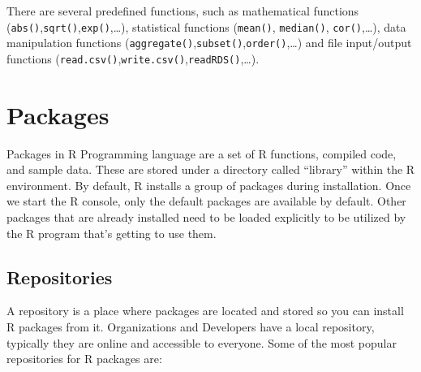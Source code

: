 \documentclass[
]{book}
\begin{document}
There are several predefined functions, such as mathematical functions (\texttt{abs()},\texttt{sqrt()},\texttt{exp()},\ldots), statistical functions (\texttt{mean()}, \texttt{median()}, \texttt{cor()},\ldots), data manipulation functions (\texttt{aggregate()},\texttt{subset()},\texttt{order()},\ldots) and file input/output functions (\texttt{read.csv()},\texttt{write.csv()},\texttt{readRDS()},\ldots).

\hypertarget{packages}{%
\section{Packages}\label{packages}}

Packages in R Programming language are a set of R functions, compiled code, and sample data. These are stored under a directory called ``library'' within the R environment. By default, R installs a group of packages during installation. Once we start the R console, only the default packages are available by default. Other packages that are already installed need to be loaded explicitly to be utilized by the R program that's getting to use them.

\hypertarget{repositories}{%
\subsection*{Repositories}\label{repositories}}

A repository is a place where packages are located and stored so you can install R packages from it. Organizations and Developers have a local repository, typically they are online and accessible to everyone. Some of the most popular repositories for R packages are:
\end{document}
